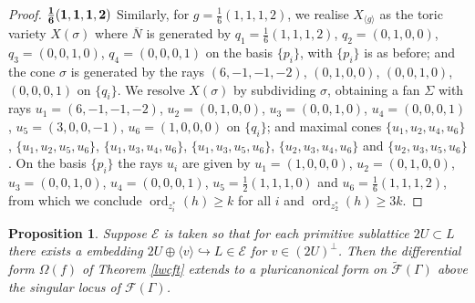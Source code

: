 \documentclass[12pt, a4paper]{article}
\newtheorem{proposition}[thm]{Proposition}
\newcommand{\la}{\langle}
\newcommand{\ra}{\rangle}
\newcommand{\ec}{\mathcal{E}}
\newcommand{\fc}{\mathcal{F}}
\newcommand{\opn}{\operatorname}
\newcommand{\op}{\oplus}
\begin{document}
\begin{proof}
\noindent  $\bold{\frac{1}{6}(1,1,1,2)}$
Similarly, for $g=\frac{1}{6}(1,1,1,2)$, we realise $X_{\la g \ra}$  as the toric variety $X(\sigma)$ where  $\overline{N}$ is generated by 
$q_1=\frac{1}{6}(1,1,1,2)$,
$q_2=(0,1,0,0)$,
$q_3=(0,0,1,0)$,
$q_4=(0,0,0,1)$ on the basis $\{p_i\}$, with $\{p_i\}$ is as before;
and the cone $\sigma$ is generated by the rays 
$(6,-1,-1,-2)$,
$(0,1,0,0)$,
$(0,0,1,0)$,
$(0,0,0,1)$
on $\{q_i\}$.
We resolve $X(\sigma)$ by subdividing $\sigma$, obtaining a fan $\Sigma$ with rays
$u_1=(6,-1,-1,-2)$,
$u_2=(0,1,0,0)$,
$u_3=(0,0,1,0)$,
$u_4=(0,0,0,1)$,
$u_5=(3,0,0,-1)$,
$u_6=(1,0,0,0)$
on $\{q_i\}$;
and maximal cones
$\{u_1, u_2, u_4, u_6 \}$,
$\{u_1, u_2, u_5, u_6 \}$,
$\{u_1, u_3, u_4, u_6 \}$,
$\{u_1, u_3, u_5, u_6 \}$,
$\{u_2, u_3, u_4, u_6 \}$ 
and 
$\{u_2, u_3, u_5, u_6 \}$.
On the basis $\{p_i\}$ the rays $u_i$ are given by
$u_1 = (1,0,0,0)$,
$u_2 = (0,1,0,0)$,
$u_3 = (0,0,1,0)$,
$u_4 = (0,0,0,1)$,
$u_5 = \frac{1}{2}(1,1,1,0)$ 
and 
$u_6 = \frac{1}{6}(1,1,1,2)$,
from which we conclude
$\opn{ord}_{z_i^*}(h) \geq k$ for all $i$ and
$\opn{ord}_{z_2^*}(h) \geq 3k$.
\end{proof}
\begin{proposition}\label{intsingextprop}
  Suppose $\ec$ is taken so that for each
  primitive sublattice $2U \subset L$ there exists a embedding $2U \op \la v \ra \hookrightarrow L \in \ec$ for $v \in (2U)^{\perp}$.
  Then the differential form $\Omega(f)$ of Theorem \ref{lwcft} extends to a pluricanonical form on $\widetilde{\fc}(\Gamma)$ above the singular locus of $\fc(\Gamma)$.
\end{proposition}
\end{document}

